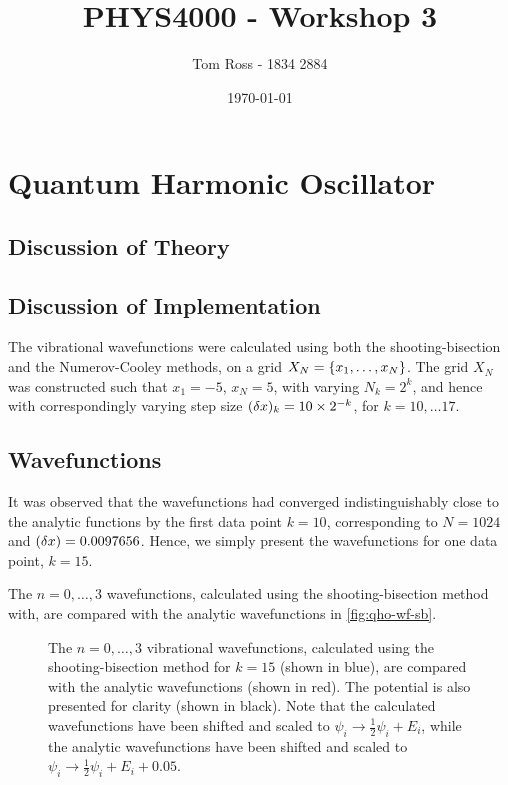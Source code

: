\documentclass{article}
\title{PHYS4000 - Workshop 3}
\author{Tom Ross - 1834 2884}
\date{\today}
\begin{document}
\tableofcontents

\listoffigures

\listoftables

\clearpage

\section{Quantum Harmonic Oscillator}
\label{sec:qho}

\subsection*{Discussion of Theory}
\label{sec:qho-theory}

\subsection*{Discussion of Implementation}
\label{sec:qho-implementation}

The vibrational wavefunctions were calculated using both the shooting-bisection
and the Numerov-Cooley methods, on a grid
$X_{N} = \lbrace x_{1}, \dotsc, x_{N}\rbrace$.
The grid $X_{N}$ was constructed such that $x_{1} = -5$, $x_{N} = 5$, with
varying $N_{k} = 2^{k}$, and hence with correspondingly varying step size
$(\delta x)_{k} = 10 \times 2^{-k}$, for $k = 10, \dotsc 17$.

\subsection*{Wavefunctions}
\label{sec:qho-wavefunctions}

It was observed that the wavefunctions had converged indistinguishably close to
the analytic functions by the first data point $k = 10$, corresponding to
$N = 1024$ and $(\delta x) = 0.0097656$.
Hence, we simply present the wavefunctions for one data point, $k = 15$.

The $n = 0, \dotsc, 3$ wavefunctions, calculated using the shooting-bisection
method with, are compared with the analytic wavefunctions in
\autoref{fig:qho-wf-sb}.

\begin{figure}[h]
  \begin{center}
    
  \end{center}
  \caption[S-B Wavefunctions]{
    The $n = 0, \dotsc, 3$ vibrational wavefunctions, calculated using the
    shooting-bisection method for $k = 15$ (shown in blue), are compared with
    the analytic wavefunctions (shown in red).
    The potential is also presented for clarity (shown in black).
    Note that the calculated wavefunctions have been shifted and scaled to
    $\psi_{i} \to \tfrac{1}{2}\psi_{i} + E_{i}$, while the analytic
    wavefunctions have been shifted and scaled to
    $\psi_{i} \to \tfrac{1}{2}\psi_{i} + E_{i} + 0.05$.
  }
  \label{fig:qho-wf-sb}
\end{figure}
\end{document}
